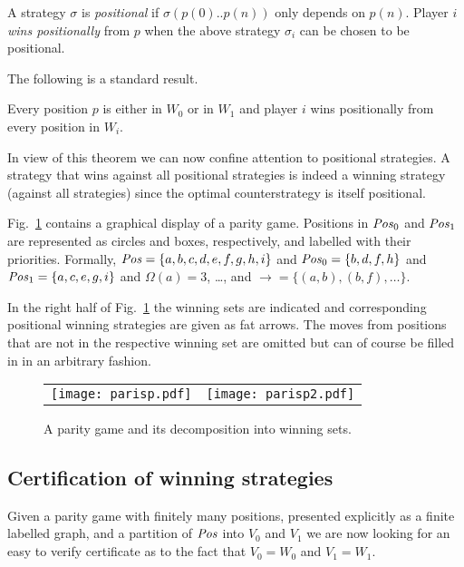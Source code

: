 A strategy $\sigma$ is \emph{positional} if $\sigma(p(0)..p(n))$ only
depends on $p(n)$\@.  Player $i$ \emph{wins positionally} from $p$
when the above strategy $\sigma_i$ can be chosen to be positional.

The following is a standard result.
\begin{theorem}\label{theorem.positional.wins}
Every position $p$ is either in $W_0$ or in $W_1$ and player $i$ wins
positionally from every position in $W_i$\@. 
\end{theorem}
In view of this theorem we can now confine attention to positional
strategies. A strategy that wins against all positional strategies is
indeed a winning strategy (against all strategies) since the optimal
counterstrategy is itself positional. 
\begin{example}
  Fig.~\ref{parisp} contains a graphical display of a parity game. 
Positions in $\mathit{Pos}_0$ and $\mathit{Pos}_1$ are
  represented as circles and boxes, respectively, and labelled with
  their priorities. Formally, $\mathit{Pos}=\{a,b,c,d,e,f,g,h,i\}$ and $\mathit{Pos}_0=\{b,d,f,h\}$ and $\mathit{Pos}_1=\{a,c,e,g,i\}$ and $\Omega(a)=3$, \dots, and $\rightarrow=\{(a,b), (b,f),\dots\}$. 

  In the right half of Fig.~\ref{parisp} the winning sets are
  indicated and corresponding positional winning strategies are given
  as fat arrows. The moves from positions that are not in the
  respective winning set are omitted but can of course be filled in in
  an arbitrary fashion.
\end{example}
\begin{figure}
\begin{tabular}{cc}
\texttt{[image: parisp.pdf]} \hspace{3em} & \texttt{[image: parisp2.pdf]} 
\end{tabular}
\caption{\label{parisp}
A parity game and its decomposition into winning sets.}
 \end{figure}
\subsection{Certification of winning strategies}




Given a parity game with finitely many positions, presented explicitly as a finite labelled graph, and 
a partition of $\mathit{Pos}$ into $V_0$ and $V_1$ we are now looking for an
easy to verify certificate as to the fact that $V_0 = W_0$ and $V_1 = W_1$\@.

